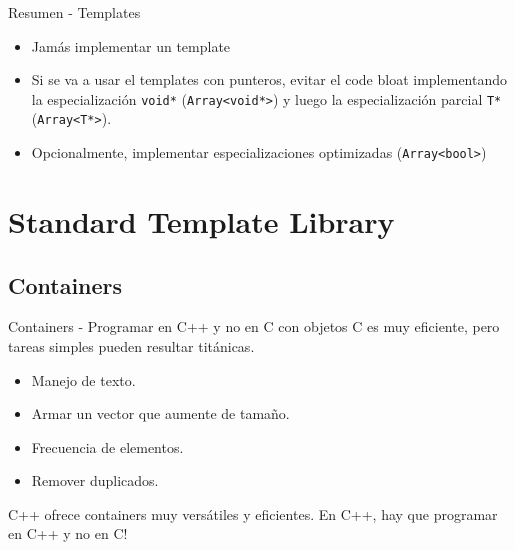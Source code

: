\begin{frame}[fragile]{Resumen - Templates}
   \begin{itemize}
      \item \alert{Jam\'as} implementar un template 
      \item<3-> Si se va a usar el templates con punteros, evitar el code bloat implementando la especializaci\'on \lstinline[style=normal]!void*! (\lstinline[style=normal]!Array<void*>!) y luego la especializaci\'on parcial \lstinline[style=normal]!T*! (\lstinline[style=normal]!Array<T*>!).
      \item<4-> Opcionalmente, implementar especializaciones optimizadas (\lstinline[style=normal]!Array<bool>!)
   \end{itemize}
\end{frame}

\section{Standard Template Library}
\subsection{Containers}
\begin{frame}[fragile]{Containers - Programar en C++ y no en C con objetos}
C es muy eficiente, pero tareas simples pueden resultar tit\'anicas.
   \pause
   \begin{itemize}
      \item Manejo de texto.
      \item Armar un vector que aumente de tama\~no.
      \item Frecuencia de elementos.
      \item Remover duplicados.
   \end{itemize}
   \pause
\vphantom{X}
C++ ofrece containers muy vers\'atiles y eficientes. En C++, hay que programar en C++ y \alert{no en C}!
\end{frame}


